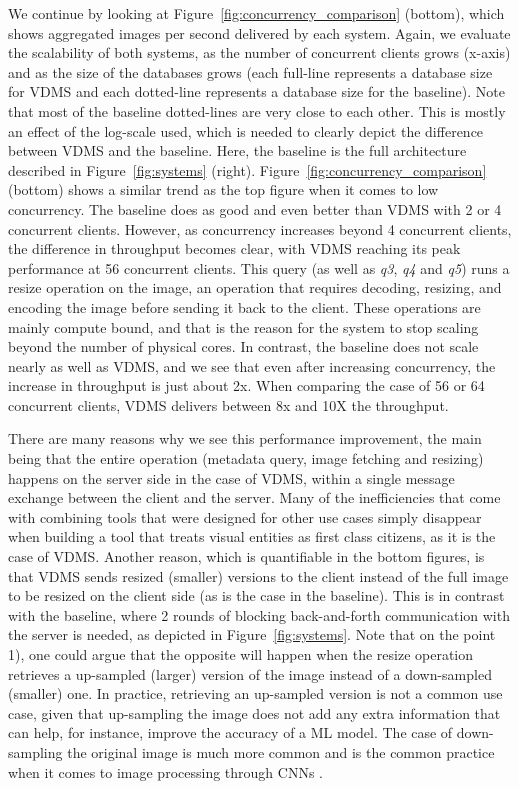 We continue by looking at Figure~\ref{fig:concurrency_comparison} (bottom),
which shows aggregated images per second delivered by each system.
Again, we evaluate the scalability of both systems, as the number of
concurrent clients grows (x-axis) and as the
size of the databases grows (each full-line represents a database size
for VDMS and each dotted-line represents a database size for the baseline).
Note that most of the baseline dotted-lines are very close to each other.
This is mostly an effect of the log-scale used, which is needed to clearly
depict the difference between VDMS and the baseline.
Here, the baseline is the full architecture described in
Figure~\ref{fig:systems} (right).
Figure~\ref{fig:concurrency_comparison} (bottom) shows a similar trend as the top
figure when it comes to low concurrency. The baseline does as good and even better than VDMS with 2 or 4 concurrent clients.
However, as concurrency increases beyond 4 concurrent clients, the difference
in throughput becomes clear, with VDMS reaching its peak performance at
56 concurrent clients.
This query (as well as \textit{q3}, \textit{q4} and \textit{q5}) runs a resize operation on the image,
an operation that requires decoding, resizing, and encoding the image
before sending it back to the client.
These operations are mainly compute bound, and that is the reason for
the system to stop scaling beyond the number of physical cores.
In contrast, the baseline does not scale nearly as well as VDMS,
and we see that even after increasing concurrency, the increase
in throughput is just about 2x.
When comparing the case of 56 or 64 concurrent clients,
VDMS delivers between 8x and 10X the throughput.

There are many reasons why we see this performance improvement, the main being
that the entire operation (metadata query, image fetching and resizing) happens
on the server side in the case of VDMS, within a single message
exchange between the client and the server.
Many of the inefficiencies that come with combining tools that were designed
for other use cases simply disappear when building a tool that treats
visual entities as first class citizens, as it is the case of VDMS.
Another reason, which is quantifiable in the bottom figures, is that
VDMS sends resized (smaller) versions to the client instead of the full image
to be resized on the client side (as is the case in the baseline).
This is in contrast with the baseline, where 2 rounds of blocking back-and-forth
communication with the server is needed, as depicted in Figure~\ref{fig:systems}.
Note that on the point 1), one could argue that the opposite will happen
when the resize operation retrieves a up-sampled (larger) version of the image
instead of a down-sampled (smaller) one.
In practice, retrieving an up-sampled version is not a common use case,
given that up-sampling the image does not add any extra information that can help,
for instance, improve the accuracy of a ML model.
The case of down-sampling the original image is much more common and is the common
practice when it comes to image processing through CNNs \cite{cnn,resnet}.

